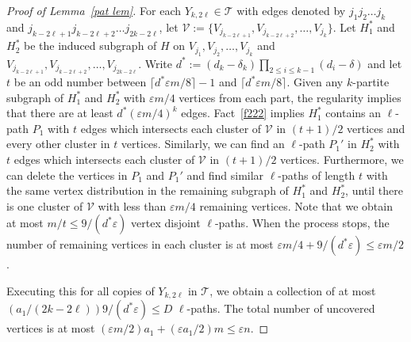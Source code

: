\documentclass[11pt, reqno]{amsart}    	%
\theoremstyle{definition}
\numberwithin{equation}{section}
\begin{document}
\begin{proof}[Proof of Lemma~\ref{pat lem}]
		
		
		For each  $ Y_{k,2\ell}\in \mathcal{T}$  with edges denoted by $j_1j_2\dots j_k$ and $j_{k-2\ell+1}j_{k-2\ell+2}\dots j_{2k-2\ell}$, let $\mathcal{V}:=\{V_{j_{k-2\ell+1}},V_{j_{k-2\ell+2}},\dots,V_{j_{k}}\} $. 
		Let $ H^{*}_1 $ and $ H^{*}_2$ be the induced subgraph of $H$ on $ V_{j_1},V_{j_2},\dots,V_{j_k} $ and $ V_{j_{k-2\ell+1}},V_{j_{k-2\ell+2}},\dots,V_{j_{2k-2\ell}} $.
		Write $d^*:=(d_k-\delta_k)\prod_{2\le i\le k-1}(d_i-\delta)$ and let $t$ be an odd number between $\lceil d^*\varepsilon m/8\rceil-1$ and $\lceil d^*\varepsilon m/8\rceil$.
		Given any $k$-partite subgraph of $ H^{*}_1 $ and $ H^{*}_2$ with $\varepsilon m/4$ vertices from each part, the regularity implies that there are at least $d^*(\varepsilon m/4)^k$ edges.
		Fact~\ref{f222} implies $ H^{*}_1 $ contains an $\ell$-path $P_1 $ with $t$ edges which intersects each cluster of $ \mathcal{V} $ in $(t+1)/2 $ vertices and every other cluster in $ t $ vertices. 
		Similarly, we can find an $\ell$-path $P_1' $ in $ H^{*}_2$ with $ t$ edges which intersects each cluster of $ \mathcal{V} $ in $ (t+1)/2 $ vertices. 
		Furthermore, we can delete the vertices in $ P_1 $ and $ P_1' $ and find similar $\ell$-paths of length $t$ with the same vertex distribution in the remaining subgraph of $ H^{*}_1 $ and $ H^{*}_2$, until there is one cluster of $ \mathcal{V} $ with less than $\varepsilon m/4$ remaining vertices.
		Note that we obtain at most $ m/t \le 9/(d^*\varepsilon)$ vertex disjoint $\ell$-paths.
		When the process stops, the number of remaining vertices in each cluster is at most $\varepsilon m/4 + 9/(d^*\varepsilon)\le \varepsilon m/2$.
		
		Executing this for all copies of $ Y_{k,2\ell}$ in $ \mathcal{T}$, we obtain a collection of at most $(a_1/(2k-2\ell)) 9/(d^*\varepsilon)\le D $ $ \ell $-paths.
		The total number of uncovered vertices is at most
		$(\varepsilon m/2)a_1+(\varepsilon a_1/2)m \le\varepsilon n$.\end{proof}
	
\end{document}
